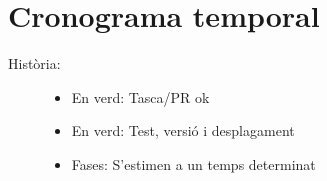 \documentclass[letterpaper,11pt,catalan]{sphinxmanual}
\begin{document}
\section{Cronograma temporal}
\label{\detokenize{index:cronograma-temporal}}\begin{description}
\item[{Història:}] \leavevmode\begin{itemize}
\item {} 
En verd: Tasca/PR ok

\item {} 
En verd: Test, versió i desplagament

\item {} 
Fases: S'estimen a un temps determinat

\end{itemize}

\end{description}


\begin{DUlineblock}{0em}
\item[] 
\end{DUlineblock}
\end{document}
